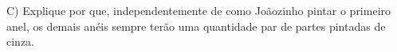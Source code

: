 \documentclass[preview]{standalone}
\begin{document}
\begin{center}
C) Explique por que, independentemente de como Joãozinho pintar o primeiro anel, os demais anéis sempre terão uma
quantidade par de partes pintadas de cinza.
\end{center}
\end{document}
